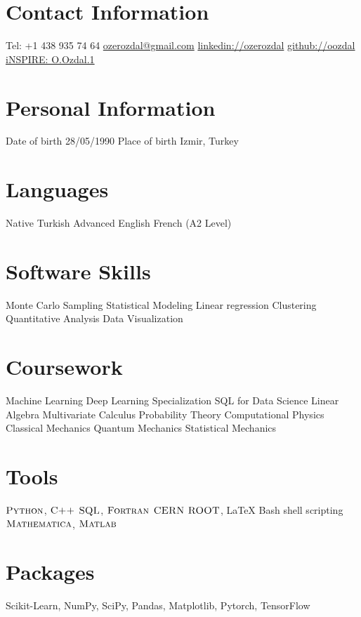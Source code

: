 \documentclass[]{friggeri-cv}
\begin{document}


\begin{aside}
  \section{Contact Information}
    Tel: +1 438 935 74 64
    \href{mailto:ozerozdal@gmail.com}{ozerozdal@gmail.com}
    \href{http://www.linkedin.com/in/ozerozdal/}{linkedin://ozerozdal}
    \href{http://github.com/oozdal}{github://oozdal}
 	\href{https://inspirehep.net/author/profile/O.Ozdal.1}{iNSPIRE: O.Ozdal.1}   
  \section{Personal Information}
  	\bullet Date of birth 
  	28/05/1990
  	\bullet Place of birth
  	Izmir, Turkey
  \section{Languages}
    Native Turkish
    Advanced English 
    French (A2 Level)
  \section{Software Skills}
    Monte Carlo Sampling
    Statistical Modeling
    Linear regression
	Clustering     
    Quantitative Analysis    
    Data Visualization
  \section{Coursework}  
  \bullet Machine Learning
  \bullet Deep Learning Specialization
  \bullet SQL for Data Science
  \bullet Linear Algebra
  \bullet Multivariate Calculus
  \bullet Probability Theory
  \bullet Computational Physics    
  \bullet Classical Mechanics
  \bullet Quantum Mechanics
  \bullet Statistical Mechanics
    \section{Tools}
    $\textsc{Python}$, $\textsc{C++}$ 
    $\textsc{SQL}$, $\textsc{Fortran}$
    $\textsc{CERN ROOT}$, LaTeX   
    Bash shell scripting
    $\textsc{Mathematica}$,  $\textsc{Matlab}$
    \section{Packages}  
    Scikit-Learn,
    NumPy, SciPy,
    Pandas, Matplotlib,
    Pytorch, TensorFlow    
\end{aside}
\end{document}
